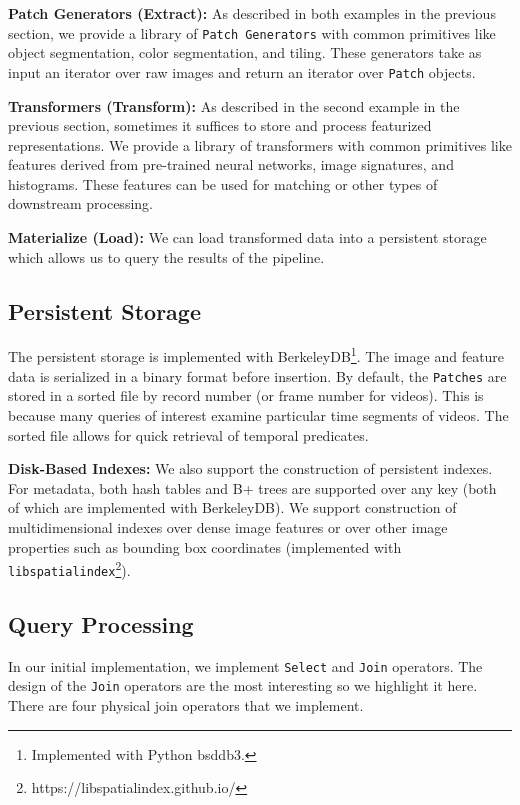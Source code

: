 \vspace{0.25em}
\noindent \textbf{Patch Generators (Extract): } As described in both examples in the previous section, we provide a library of \texttt{Patch Generators} with common primitives like object segmentation, color segmentation, and tiling. These generators take as input an iterator over raw images and return an iterator over \texttt{Patch} objects.



\vspace{0.25em}
\noindent \textbf{Transformers (Transform): } As described in the second example in the previous section, sometimes it suffices to store and process featurized representations. We provide a library of transformers with common primitives like features derived from pre-trained neural networks, image signatures, and histograms. These features can be used for matching or other types of downstream processing.

\vspace{0.25em}
\noindent \textbf{Materialize (Load): } We can load transformed data into a persistent storage which allows us to query the results of the pipeline.

\subsection{Persistent Storage}
The persistent storage is implemented with BerkeleyDB\footnote{Implemented with Python bsddb3.}. The image and feature data is serialized in a binary format before insertion. By default, the \texttt{Patches} are stored in a sorted file by record number (or frame number for videos). This is because many queries of interest examine particular time segments of videos.
The sorted file allows for quick retrieval of temporal predicates.

\vspace{0.25em}
\noindent \textbf{Disk-Based Indexes: } We also support the construction of persistent indexes. For metadata, both hash tables and B+ trees are supported over any key (both of which are implemented with BerkeleyDB). We support construction of multidimensional indexes over dense image features or over other image properties such as bounding box coordinates (implemented with \texttt{libspatialindex}\footnote{https://libspatialindex.github.io/}).

\subsection{Query Processing}
In our initial implementation, we implement \texttt{Select} and \texttt{Join} operators. The design of the \texttt{Join} operators are the most interesting so we highlight it here. There are four physical join operators that we implement.   

